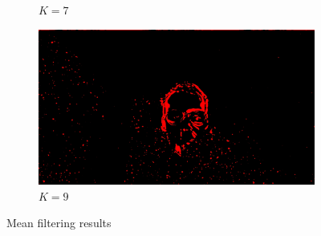 \documentclass[paper=a4, fontsize=10pt]{scrartcl}	%
\begin{document}
\begin{figure}[H]
\begin{subfigure}{0.2\textwidth}
			\caption{$K=7$}
		\end{subfigure}%
		\begin{subfigure}{0.2\textwidth}
			\includegraphics[width=\linewidth]{images/heatmap/img_mean/img_man_red9.jpg}
			\caption{$K=9$}
	\end{subfigure}
		
		\caption{Mean filtering results}
		\label{fig:mean_filter}
	\end{figure}
\end{document}
